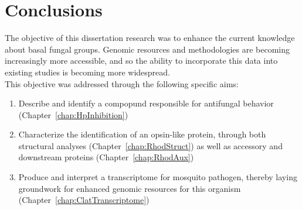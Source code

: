\chapter{Conclusions}
The objective of this dissertation research was to enhance the current knowledge about basal fungal groups. Genomic resources and methodologies are becoming increasingly more accessible, and so the ability to incorporate this data into existing studies is becoming more widespread.\\
\indent This objective was addressed through the following specific aims:\\
\begin{enumerate}
  \item Describe and identify a compopund responsible for antifungal behavior (Chapter~\ref{chap:HpInhibition})
  \item Characterize the identification of an opsin-like protein, through both structural analyses (Chapter~\ref{chap:RhodStruct}) as well as accessory and downstream proteins (Chapter~\ref{chap:RhodAux})
  \item Produce and interpret a transcriptome for mosquito pathogen, thereby laying groundwork for enhanced genomic resources for this organism (Chapter~\ref{chap:ClatTranscriptome})
\end{enumerate}
